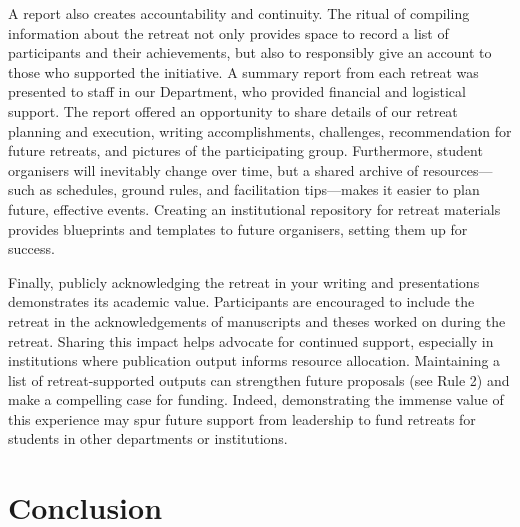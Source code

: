 \documentclass[10pt,letterpaper]{article}
\begin{document}
A report also creates accountability and continuity. The ritual of compiling information about the retreat not only provides space to record a list of participants and their achievements, but also to responsibly give an account to those who supported the initiative. A summary report from each retreat was presented to staff in our Department, who provided financial and logistical support. The report offered an opportunity to share details of our retreat planning and execution, writing accomplishments, challenges, recommendation for future retreats, and pictures of the participating group. Furthermore, student organisers will inevitably change over time, but a shared archive of resources---such as schedules, ground rules, and facilitation tips---makes it easier to plan future, effective events. Creating an institutional repository for retreat materials provides blueprints and templates to future organisers, setting them up for success.

Finally, publicly acknowledging the retreat in your writing and presentations demonstrates its academic value. Participants are encouraged to include the retreat in the acknowledgements of manuscripts and theses worked on during the retreat. Sharing this impact helps advocate for continued support, especially in institutions where publication output informs resource allocation. Maintaining a list of retreat-supported outputs can strengthen future proposals (see Rule 2) and make a compelling case for funding. Indeed, demonstrating the immense value of this experience may spur future support from leadership to fund retreats for students in other departments or institutions.

\section*{Conclusion}
\end{document}
